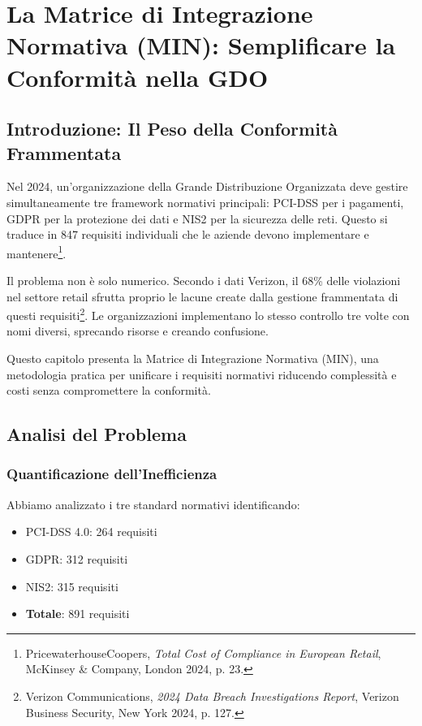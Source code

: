 \chapter{La Matrice di Integrazione Normativa (MIN): Semplificare la Conformità nella GDO}

\section{Introduzione: Il Peso della Conformità Frammentata}

Nel 2024, un'organizzazione della Grande Distribuzione Organizzata deve gestire simultaneamente tre framework normativi principali: PCI-DSS per i pagamenti, GDPR per la protezione dei dati e NIS2 per la sicurezza delle reti. Questo si traduce in 847 requisiti individuali che le aziende devono implementare e mantenere\footnote{PricewaterhouseCoopers, \textit{Total Cost of Compliance in European Retail}, McKinsey \& Company, London 2024, p. 23.}.

Il problema non è solo numerico. Secondo i dati Verizon, il 68\% delle violazioni nel settore retail sfrutta proprio le lacune create dalla gestione frammentata di questi requisiti\footnote{Verizon Communications, \textit{2024 Data Breach Investigations Report}, Verizon Business Security, New York 2024, p. 127.}. Le organizzazioni implementano lo stesso controllo tre volte con nomi diversi, sprecando risorse e creando confusione.

Questo capitolo presenta la Matrice di Integrazione Normativa (MIN), una metodologia pratica per unificare i requisiti normativi riducendo complessità e costi senza compromettere la conformità.

\section{Analisi del Problema}

\subsection{Quantificazione dell'Inefficienza}

Abbiamo analizzato i tre standard normativi identificando:
\begin{itemize}
\item PCI-DSS 4.0: 264 requisiti
\item GDPR: 312 requisiti  
\item NIS2: 315 requisiti
\item \textbf{Totale}: 891 requisiti
\end{itemize}

